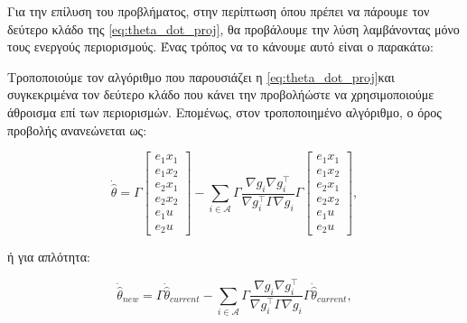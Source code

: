 \documentclass[12pt]{article} %
\numberwithin{equation}{section}  %
\renewenvironment{examplebox}[1]{%
  \ifthenelse{\boolean{showexamples}}%
    {\begin{tcolorbox}[colback=white, colframe=gray!30, title={#1}, sharp corners, boxrule=0.5pt, coltitle=black]}%
    {\expandafter\comment}%
}{%
  \ifthenelse{\boolean{showexamples}}%
    {\end{tcolorbox}}%
    {\expandafter\endcomment}%
}
\begin{document}


Για την επίλυση του προβλήματος, στην περίπτωση όπου πρέπει να πάρουμε τον δεύτερο κλάδο της \eqref{eq:theta_dot_proj}, θα προβάλουμε την λύση λαμβάνοντας μόνο τους ενεργούς περιορισμούς. Ένας τρόπος να το κάνουμε αυτό είναι ο παρακάτω:

Τροποποιούμε τον αλγόριθμο που παρουσιάζει η \eqref{eq:theta_dot_proj}\textemdash και συγκεκριμένα τον δεύτερο κλάδο που κάνει την προβολή\textemdash ώστε να χρησιμοποιούμε άθροισμα επί των περιορισμών.
Επομένως, στον τροποποιημένο αλγόριθμο, ο όρος προβολής ανανεώνεται ως:

\begin{equation}
    \dot{\hat{\theta}} = 
    \Gamma \begin{bmatrix} e_1 x_1 \\ e_1 x_2 \\ e_2 x_1 \\ e_2 x_2 \\ e_1 u \\ e_2 u \end{bmatrix} - 
    \sum_{i \in \mathcal{A}} \Gamma \frac{\nabla g_i \nabla g_i^{\top}}{\nabla g_i^{\top} \Gamma \nabla g_i} \Gamma \begin{bmatrix} e_1 x_1 \\ e_1 x_2 \\ e_2 x_1 \\ e_2 x_2 \\ e_1 u \\ e_2 u \end{bmatrix},
\end{equation}

ή για απλότητα:

\begin{equation}\label{eq:update_theta}
    \dot{\hat{\theta}}_{new} = 
    \Gamma \dot{\hat{\theta}}_{current} - 
    \sum_{i \in \mathcal{A}} \Gamma \frac{\nabla g_i \nabla g_i^{\top}}{\nabla g_i^{\top} \Gamma \nabla g_i} \Gamma \dot{\hat{\theta}}_{current},
\end{equation}
\end{document}
